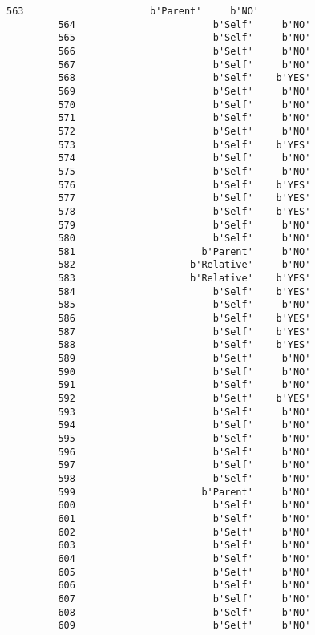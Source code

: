 \documentclass[11pt]{article}
\begin{document}
\begin{Verbatim}[commandchars=\\\{\}]
         563                      b'Parent'     b'NO'  
         564                        b'Self'     b'NO'  
         565                        b'Self'     b'NO'  
         566                        b'Self'     b'NO'  
         567                        b'Self'     b'NO'  
         568                        b'Self'    b'YES'  
         569                        b'Self'     b'NO'  
         570                        b'Self'     b'NO'  
         571                        b'Self'     b'NO'  
         572                        b'Self'     b'NO'  
         573                        b'Self'    b'YES'  
         574                        b'Self'     b'NO'  
         575                        b'Self'     b'NO'  
         576                        b'Self'    b'YES'  
         577                        b'Self'    b'YES'  
         578                        b'Self'    b'YES'  
         579                        b'Self'     b'NO'  
         580                        b'Self'     b'NO'  
         581                      b'Parent'     b'NO'  
         582                    b'Relative'     b'NO'  
         583                    b'Relative'    b'YES'  
         584                        b'Self'    b'YES'  
         585                        b'Self'     b'NO'  
         586                        b'Self'    b'YES'  
         587                        b'Self'    b'YES'  
         588                        b'Self'    b'YES'  
         589                        b'Self'     b'NO'  
         590                        b'Self'     b'NO'  
         591                        b'Self'     b'NO'  
         592                        b'Self'    b'YES'  
         593                        b'Self'     b'NO'  
         594                        b'Self'     b'NO'  
         595                        b'Self'     b'NO'  
         596                        b'Self'     b'NO'  
         597                        b'Self'     b'NO'  
         598                        b'Self'     b'NO'  
         599                      b'Parent'     b'NO'  
         600                        b'Self'     b'NO'  
         601                        b'Self'     b'NO'  
         602                        b'Self'     b'NO'  
         603                        b'Self'     b'NO'  
         604                        b'Self'     b'NO'  
         605                        b'Self'     b'NO'  
         606                        b'Self'     b'NO'  
         607                        b'Self'     b'NO'  
         608                        b'Self'     b'NO'  
         609                        b'Self'     b'NO'  

\end{Verbatim}
\end{document}

